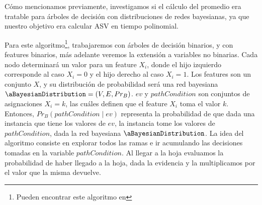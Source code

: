 Cómo mencionamos previamente, investigamos si el cálculo del promedio era tratable para árboles de decisión con distribuciones de redes bayesianas, ya que nuestro objetivo era calcular ASV en tiempo polinomial. %



Para este algoritmo\footnote{Pueden encontrar este algoritmo en }, trabajaremos con árboles de decisión binarios, y con features binarios, más adelante veremos la extensión a variables no binarias. Cada nodo determinará un valor para un feature $X_i$, donde el hijo izquierdo corresponde al caso $X_i=0$ y el hijo derecho al caso $X_i=1$. Los features son un conjunto $X$, y su distribución de probabilidad será una red bayesiana $\aBayesianDistribution = (V, E, Pr_B)$. $ev$ y $pathCondition$ son conjuntos de asignaciones $X_i = k$, las cuáles definen que el feature $X_i$ toma el valor $k$. Entonces, $Pr_B(pathCondition \mid ev)$ representa la probabilidad de que dada una instancia que tiene los valores de $ev$, la instancia tome los valores de $pathCondition$, dada la red bayesiana $\aBayesianDistribution$. La idea del algoritmo consiste en explorar todos las ramas e ir acumulando las decisiones tomadas en la variable $pathCondition$. Al llegar a la hoja evaluamos la probabilidad de haber llegado a la hoja, dada la evidencia y la multiplicamos por el valor que la misma devuelve. 






